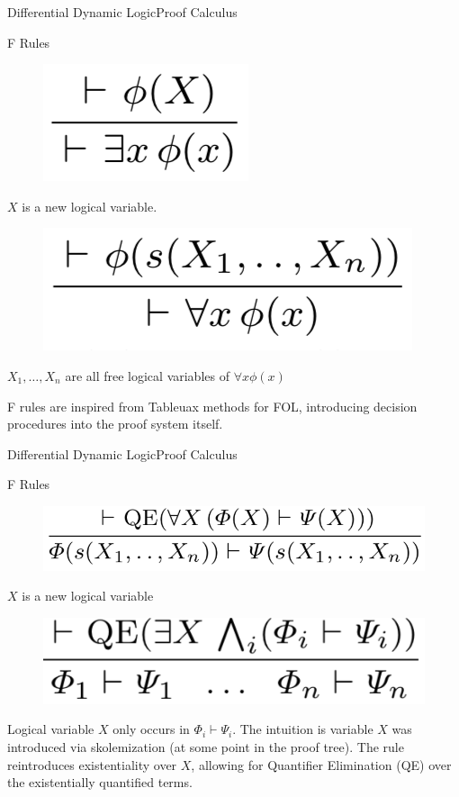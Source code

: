 \documentclass{beamer}
\begin{document}
\begin{frame}{Differential Dynamic Logic}{Proof Calculus}
  \begin{block}{F Rules}
  \begin{figure}
    \centering
    \includegraphics[scale=0.5]{F-existential-rule}
  \end{figure}
  $X$ is a new logical variable.
  \begin{figure}
    \centering
    \includegraphics[scale=0.5]{F-universal-rule}
  \end{figure}
  $X_1, \ldots, X_n$ are all free logical variables of $\forall x \phi(x)$
  \end{block}
  F rules are inspired from Tableuax methods for FOL, introducing decision
  procedures into the proof system itself.
\end{frame}


\begin{frame}{Differential Dynamic Logic}{Proof Calculus}
  \begin{block}{F Rules}
  \begin{figure}
    \centering
    \includegraphics[scale=0.5]{F-reintroduce-forall-rule}
  \end{figure}
    $X$ is a new logical variable
  \begin{figure}
    \centering
    \includegraphics[scale=0.5]{F-introduce-existential-rule}
  \end{figure}
  Logical variable $X$ only occurs in $\Phi_i \vdash \Psi_i$. The intuition
  is variable $X$ was introduced via skolemization (at some point in the proof
  tree). The rule reintroduces existentiality over $X$, allowing for Quantifier
  Elimination (QE) over the existentially quantified terms.
  \end{block}
\end{frame}
\end{document}
